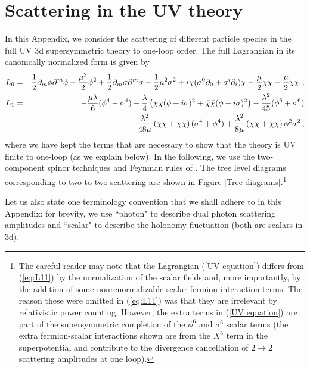 \documentclass[11pt]{article}
\begin{document}
\section{Scattering in the UV theory}
\label{appx}
In this Appendix, we consider the scattering of different particle species in the full UV 3d supersymmetric theory to one-loop order. The full Lagrangian in its canonically normalized form is given by  
%
\begin{eqnarray}
\nonumber
L_0 &=&     \frac{1}{2}\partial_m \phi\partial^m \phi -   \frac{\mu^2}{2} \phi^2  + \frac{1}{2}\partial_m \sigma\partial^m \sigma -   \frac{1}{2}\mu^2 \sigma^2   + i \bar\chi (\bar\sigma^0 \partial_0 + \bar\sigma^i \partial_i) \chi - {\mu\over 2} \chi \chi - {\mu\over 2} \bar\chi\bar\chi~,\\
\nonumber
L_1 &=&  -\frac{\mu \lambda }{6}(\phi^4 -\sigma^4)  - { \lambda \over 4} \left(\chi\chi (\phi+i\sigma)^2 + \bar\chi \bar\chi(\phi- i \sigma)^2\right) -\frac{\lambda^2}{45} ( \phi^6 + \sigma^6)\\
	&&-\frac{\lambda^2}{48\mu} \left(\chi\chi+\bar{\chi}\bar{\chi}\right)(\sigma^4+\phi^4)+\frac{\lambda^2}{8\mu}\left(\chi\chi+\bar\chi\bar\chi\right)\phi^2\sigma^2 \,,
	\label{UV equation}
     \end{eqnarray}
%		
where we have kept the terms that are necessary to show that the theory is UV finite to one-loop (as we  explain below). In the following, we  use the two-component spinor techniques and Feynman rules of \cite{Dreiner:2008tw}. The tree level diagrams corresponding to two to two  scattering are shown in Figure \ref{Tree diagrams}.\footnote{The careful reader may note that the Lagrangian (\ref{UV equation}) differs from (\ref{eq:L11}) by the normalization of the scalar fields and, more importantly, by the addition of some nonrenormalizable  scalar-fermion interaction terms.  The reason these were omitted in (\ref{eq:L11}) was that they are irrelevant by relativistic power counting. However, the  extra terms in (\ref{UV equation})  are  part of the supersymmetric completion of the $\phi^6$ and $\sigma^6$ scalar terms (the  extra fermion-scalar interactions shown are from the $X^6$ term in the superpotential and contribute to the divergence cancellation of $2 \rightarrow 2$ scattering amplitudes   at one loop).}

Let us also state one terminology convention that we shall adhere to in this Appendix: for brevity, we  use ``photon" to describe dual photon scattering amplitudes and ``scalar" to describe the holonomy fluctuation (both are scalars in 3d). 
\end{document}

